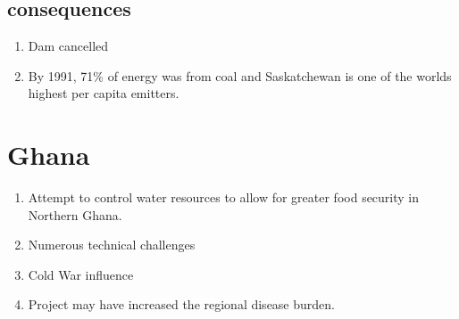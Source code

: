 \documentclass{article}
\begin{document}
\subsection{consequences}
	\begin{enumerate}
		\item	Dam cancelled
		\item	By 1991, 71\% of energy was from coal and Saskatchewan
		is one of the worlds highest per capita emitters.
	\end{enumerate}

\section{Ghana}
	\begin{enumerate}
		\item	Attempt to control water resources to allow for greater 
			food security in Northern Ghana.
		\item	Numerous technical challenges
		\item	Cold War influence
		\item	Project may have increased the regional disease burden.
	\end{enumerate}
\end{document}
